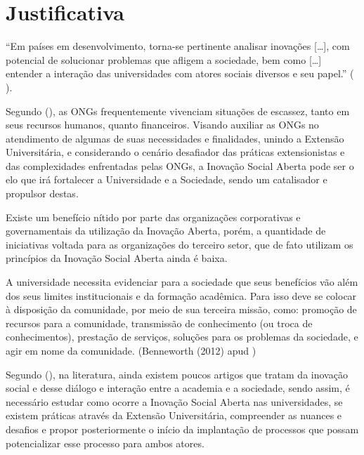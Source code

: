 \section{Justificativa}
\label{justificativa}

“Em países em desenvolvimento, torna-se pertinente analisar inovações […], com potencial de solucionar  problemas que afligem a sociedade, bem como […] entender a  interação das universidades com atores sociais diversos e seu papel.” (\citeauthor{klaumann2023} \citeyear{klaumann2023}).

Segundo \citeauthor{calefato2016} (\citeyear{calefato2016}), as \gls{ONG}s frequentemente vivenciam situações de escassez, tanto em seus recursos humanos, quanto financeiros. Visando auxiliar as \gls{ONG}s no atendimento de algumas de suas necessidades e finalidades, unindo a Extensão Universitária, e considerando o cenário desafiador das práticas extensionistas e das complexidades enfrentadas pelas ONGs, a Inovação Social Aberta pode ser o elo que irá fortalecer a Universidade e a Sociedade, sendo um catalisador e propulsor destas. 

Existe um benefício nítido por parte das organizações corporativas e governamentais da utilização da Inovação Aberta, porém, a quantidade de iniciativas voltada para as organizações do terceiro setor, que de fato utilizam os princípios da Inovação Social Aberta ainda é baixa. \cite{gama2023}

A universidade necessita evidenciar para a sociedade que seus benefícios vão além dos seus limites institucionais e da formação acadêmica. Para isso deve se colocar à disposição da comunidade, por meio de sua terceira missão, como: promoção de recursos para a comunidade, transmissão de conhecimento (ou troca de conhecimentos), prestação de serviços, soluções para os problemas da sociedade, e agir em nome da comunidade. (Benneworth (2012) apud \cite{klaumann2023})

Segundo \citeauthor{klaumann2023} (\citeyear{klaumann2023}), na literatura, ainda existem poucos artigos que tratam da inovação social e desse diálogo e interação entre a academia e a sociedade, sendo assim, é necessário estudar como ocorre a Inovação Social Aberta nas universidades, se existem práticas através da Extensão Universitária, compreender as nuances e desafios e propor posteriormente o início da implantação de processos que possam potencializar esse processo para ambos atores.

